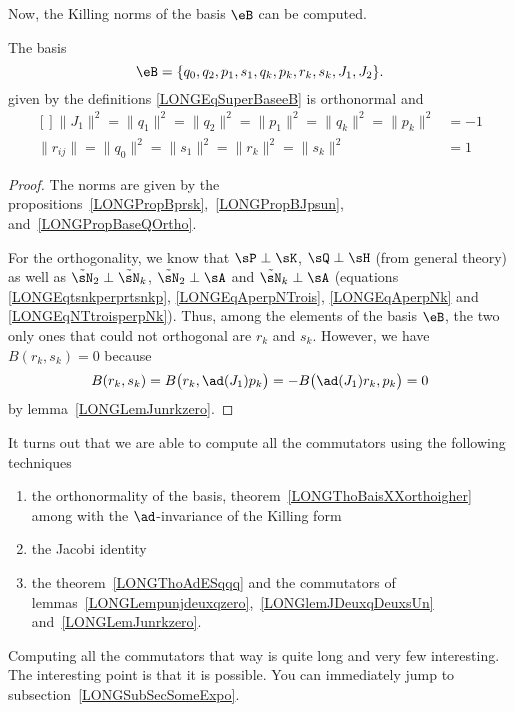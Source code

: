 Now, the Killing norms of the basis $\eB$ can be computed.
\begin{theorem}		\label{LONGThoBaisXXorthoigher}
	The basis
	\begin{equation}
		\eB=\{ q_0,q_2,p_1,s_1,q_k,p_k,r_k,s_k,J_1,J_2 \}.
	\end{equation}
	given by the definitions \eqref{LONGEqSuperBaseeB}  is orthonormal and
	\begin{equation}
		\begin{aligned}[]
			\| J_1 \|^2=\| q_1 \|^2=\| q_2 \|^2=\| p_1 \|^2=\| q_k \|^2=\| p_k \|^2&=-1\\
			\| r_{ij} \|=\| q_0 \|^2=\| s_1 \|^2=\| r_k \|^2=\| s_k \|^2&=1
			\end{aligned}
	\end{equation}
\end{theorem}

\begin{proof}
	The norms are given by the propositions~\ref{LONGPropBprsk},~\ref{LONGPropBJpsun}, and~\ref{LONGPropBaseQOrtho}.

	For the orthogonality, we know that $\sP\perp\sK$, $\sQ\perp\sH$ (from general theory) as well as $\tilde\sN_2\perp\tilde\sN_k$, $\tilde\sN_2\perp\sA$ and $\tilde\sN_k\perp\sA$ (equations \eqref{LONGEqtsnkperprtsnkp}, \eqref{LONGEqAperpNTrois}, \eqref{LONGEqAperpNk} and \eqref{LONGEqNTtroisperpNk}). Thus, among the elements of the basis $\eB$, the two only ones that could not orthogonal are $r_k$ and $s_k$. However, we have $B(r_k,s_k)=0$ because
	\begin{equation}
		B(r_k,s_k)=B\big( r_k,\ad(J_1)p_k \big)=-B\big( \ad(J_1)r_k,p_k \big)=0
	\end{equation}
	by lemma~\ref{LONGLemJunrkzero}.

\end{proof}


It turns out that we are able to compute all the commutators using the following techniques
\begin{enumerate}

	\item
		the orthonormality of the basis, theorem~\ref{LONGThoBaisXXorthoigher} among with the $\ad$-invariance of the Killing form
	\item
		the Jacobi identity
	\item
		the theorem~\ref{LONGThoAdESqqq} and the commutators of lemmas~\ref{LONGLempunjdeuxqzero},~\ref{LONGlemJDeuxqDeuxsUn} and~\ref{LONGLemJunrkzero}.

\end{enumerate}
Computing all the commutators that way is quite long and very few interesting. The interesting point is that it is possible. You can immediately jump to subsection~\ref{LONGSubSecSomeExpo}.

